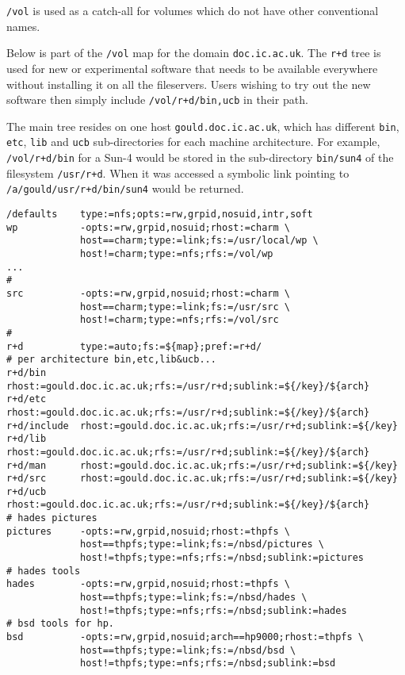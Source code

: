 {\tt /vol} is used as a catch-all for volumes which do not have other conventional names.

Below is part of the {\tt /vol} map for the domain {\tt doc.ic.ac.uk}.
The {\tt r+d} tree is used for new or experimental software that needs to be
available everywhere without installing it on all the fileservers.  Users wishing to
try out the new software then simply include {\tt /vol/r+d/{bin,ucb}} in their path.

The main tree resides on one host {\tt gould.doc.ic.ac.uk}, which has different
{\tt bin}, {\tt etc}, {\tt lib} and {\tt ucb} sub-directories for each machine
architecture.  For example, {\tt /vol/r+d/bin} for a Sun-4 would be stored in
the sub-directory {\tt bin/sun4} of the filesystem {\tt /usr/r+d}.  When it was
accessed a symbolic link pointing to {\tt /a/gould/usr/r+d/bin/sun4} would be
returned.

\begin{verbatim}
/defaults    type:=nfs;opts:=rw,grpid,nosuid,intr,soft
wp           -opts:=rw,grpid,nosuid;rhost:=charm \
             host==charm;type:=link;fs:=/usr/local/wp \
             host!=charm;type:=nfs;rfs:=/vol/wp
...
#
src          -opts:=rw,grpid,nosuid;rhost:=charm \
             host==charm;type:=link;fs:=/usr/src \
             host!=charm;type:=nfs;rfs:=/vol/src
#
r+d          type:=auto;fs:=${map};pref:=r+d/
# per architecture bin,etc,lib&ucb...
r+d/bin      rhost:=gould.doc.ic.ac.uk;rfs:=/usr/r+d;sublink:=${/key}/${arch}
r+d/etc      rhost:=gould.doc.ic.ac.uk;rfs:=/usr/r+d;sublink:=${/key}/${arch}
r+d/include  rhost:=gould.doc.ic.ac.uk;rfs:=/usr/r+d;sublink:=${/key}
r+d/lib      rhost:=gould.doc.ic.ac.uk;rfs:=/usr/r+d;sublink:=${/key}/${arch}
r+d/man      rhost:=gould.doc.ic.ac.uk;rfs:=/usr/r+d;sublink:=${/key}
r+d/src      rhost:=gould.doc.ic.ac.uk;rfs:=/usr/r+d;sublink:=${/key}
r+d/ucb      rhost:=gould.doc.ic.ac.uk;rfs:=/usr/r+d;sublink:=${/key}/${arch}
# hades pictures
pictures     -opts:=rw,grpid,nosuid;rhost:=thpfs \
             host==thpfs;type:=link;fs:=/nbsd/pictures \
             host!=thpfs;type:=nfs;rfs:=/nbsd;sublink:=pictures
# hades tools
hades        -opts:=rw,grpid,nosuid;rhost:=thpfs \
             host==thpfs;type:=link;fs:=/nbsd/hades \
             host!=thpfs;type:=nfs;rfs:=/nbsd;sublink:=hades
# bsd tools for hp.
bsd          -opts:=rw,grpid,nosuid;arch==hp9000;rhost:=thpfs \
             host==thpfs;type:=link;fs:=/nbsd/bsd \
             host!=thpfs;type:=nfs;rfs:=/nbsd;sublink:=bsd
\end{verbatim}

